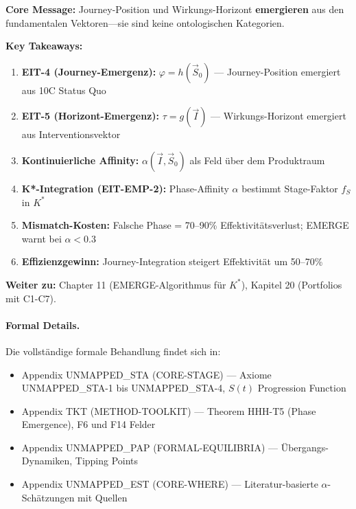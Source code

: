 \begin{tcolorbox}[colback=green!10!white, colframe=green!75!black,
    title=Key Points (Emergent Temporal Theory)]

\textbf{Core Message:} Journey-Position und Wirkungs-Horizont \textbf{emergieren} aus den fundamentalen Vektoren---sie sind keine ontologischen Kategorien.

\textbf{Key Takeaways:}
\begin{enumerate}
\item \textbf{EIT-4 (Journey-Emergenz):} $\varphi = h(\vec{S}_0)$ --- Journey-Position emergiert aus 10C Status Quo
\item \textbf{EIT-5 (Horizont-Emergenz):} $\tau = g(\vec{I})$ --- Wirkungs-Horizont emergiert aus Interventionsvektor
\item \textbf{Kontinuierliche Affinity:} $\alpha(\vec{I}, \vec{S}_0)$ als Feld über dem Produktraum
\item \textbf{K*-Integration (EIT-EMP-2):} Phase-Affinity $\alpha$ bestimmt Stage-Faktor $f_S$ in $K^*$
\item \textbf{Mismatch-Kosten:} Falsche Phase = 70--90\% Effektivitätsverlust; EMERGE warnt bei $\alpha < 0.3$
\item \textbf{Effizienzgewinn:} Journey-Integration steigert Effektivität um 50--70\%
\end{enumerate}

\textbf{Weiter zu:} Chapter 11 (EMERGE-Algorithmus für $K^*$), Kapitel 20 (Portfolios mit C1-C7).

\end{tcolorbox}

\paragraph{Formal Details.}
Die vollständige formale Behandlung findet sich in:
\begin{itemize}[nosep]
\item Appendix UNMAPPED_STA (CORE-STAGE) --- Axiome UNMAPPED_STA-1 bis UNMAPPED_STA-4, $S(t)$ Progression Function
\item Appendix TKT (METHOD-TOOLKIT) --- Theorem HHH-T5 (Phase Emergence), F6 und F14 Felder
\item Appendix UNMAPPED_PAP (FORMAL-EQUILIBRIA) --- Übergangs-Dynamiken, Tipping Points
\item Appendix UNMAPPED_EST (CORE-WHERE) --- Literatur-basierte $\alpha$-Schätzungen mit Quellen
\end{itemize}

